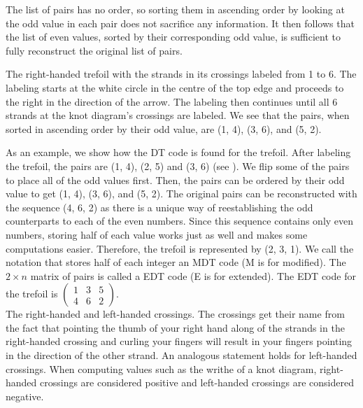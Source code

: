 \begin{paper}
The list of pairs has no order, so sorting them in ascending order by looking at
the odd value in each pair does not sacrifice any information.
It then follows that the list of even values, sorted by their corresponding odd
value, is sufficient to fully reconstruct the original list of pairs.\\

{\begin{center}\end{center}}
{The right-handed trefoil with the strands in its crossings labeled from 1 to 6.
The labeling starts at the white circle in the centre of the top edge and
proceeds to the right in the direction of the arrow.
The labeling then continues until all 6 strands at the knot diagram's crossings
are labeled.
We see that the pairs, when sorted in ascending order by their odd value, are
(1, 4), (3, 6), and (5, 2).}

As an example, we show how the DT code is found for the trefoil.
After labeling the trefoil, the pairs are (1, 4), (2, 5) and (3, 6) (see
\figLabeled).
We flip some of the pairs to place all of the odd values first.
Then, the pairs can be ordered by their odd value to get (1, 4), (3, 6), and
(5, 2).
The original pairs can be reconstructed with the sequence (4, 6, 2) as there is
a unique way of reestablishing the odd counterparts to each of the even numbers.
Since this sequence contains only even numbers, storing half of each value works
just as well and makes some computations easier.
Therefore, the trefoil is represented by (2, 3, 1).
We call the notation that stores half of each integer an MDT code (M is for
modified).
The $2\times n$ matrix of pairs is called a EDT code (E is for extended).
The EDT code for the trefoil is $\begin{pmatrix}1&3&5\\4&6&2\end{pmatrix}$.\\

{The right-handed and left-handed crossings.
The crossings get their name from the fact that pointing the thumb of your right
hand along of the strands in the right-handed crossing and curling your fingers
will result in your fingers pointing in the direction of the other strand.
An analogous statement holds for left-handed crossings.
When computing values such as the writhe of a knot diagram, right-handed
crossings are considered positive and left-handed crossings are considered
negative.}


\end{paper}
